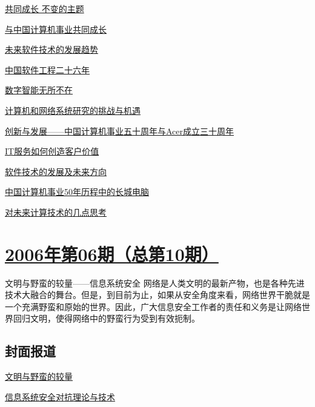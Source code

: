 \documentclass[a4paper]{article}
\begin{document}
\href{http://history.ccf.org.cn/resources/1190201776262/2010/04/15/011021.pdf}{共同成长  不变的主题}

\href{http://history.ccf.org.cn/resources/1190201776262/2010/04/15/011023.pdf}{与中国计算机事业共同成长}

\href{http://history.ccf.org.cn/resources/1190201776262/2010/04/15/011028.pdf}{未来软件技术的发展趋势}

\href{http://history.ccf.org.cn/resources/1190201776262/2010/04/15/011031.pdf}{中国软件工程二十六年}

\href{http://history.ccf.org.cn/resources/1190201776262/2010/04/15/011039.pdf}{数字智能无所不在}

\href{http://history.ccf.org.cn/resources/1190201776262/2010/04/15/011042.pdf}{计算机和网络系统研究的挑战与机遇}

\href{http://history.ccf.org.cn/resources/1190201776262/2010/04/15/011047.pdf}{创新与发展——中国计算机事业五十周年与Acer成立三十周年}

\href{http://history.ccf.org.cn/resources/1190201776262/2010/04/15/011048.pdf}{IT服务如何创造客户价值}

\href{http://history.ccf.org.cn/resources/1190201776262/2010/04/15/011051.pdf}{软件技术的发展及未来方向}

\href{http://history.ccf.org.cn/resources/1190201776262/2010/04/15/011055.pdf}{中国计算机事业50年历程中的长城电脑}

\href{http://history.ccf.org.cn/resources/1190201776262/2010/04/15/011058.pdf}{对未来计算技术的几点思考}


\section{\href{http://history.ccf.org.cn/sites/ccf/jsjtbbd.jsp?contentId=2542567628947}{\textbf{2006年第06期（总第10期）}}}
文明与野蛮的较量——信息系统安全 网络是人类文明的最新产物，也是各种先进技术大融合的舞台。但是，到目前为止，如果从安全角度来看，网络世界干脆就是一个充满野蛮和原始的世界。因此，广大信息安全工作者的责任和义务是让网络世界回归文明，使得网络中的野蛮行为受到有效扼制。
\subsection{封面报道}
\href{http://history.ccf.org.cn/resources/1190201776262/2010/04/15/010016.pdf}{文明与野蛮的较量}

\href{http://history.ccf.org.cn/resources/1190201776262/2010/04/15/010018.pdf}{信息系统安全对抗理论与技术}
\end{document}
